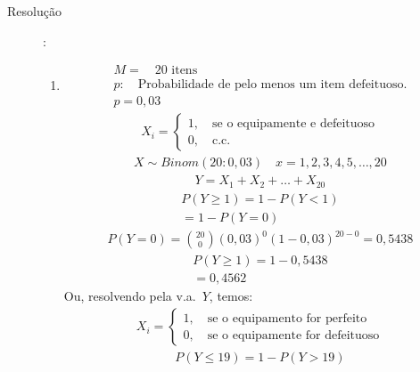 \begin{description}
    \item[Resolução]:

      \begin{enumerate}[label=(\alph*)]

        \item    
          \begin{align*}
            M=\quad \text{20 itens}\\
            p: \quad \text{Probabilidade de pelo menos um item defeituoso.}\\
          p=0,03
        \end{align*}
          \begin{align*}
           X_i= \begin{cases}
             1, \quad \text{se o equipamente e defeituoso}\\
             0, \quad \text{c.c.\ }
            \end{cases} 
          \end{align*}
          \begin{align*}
X           \sim Binom(20:0,03) \quad x=1,2,3,4,5,\dots,20
         \end{align*}
          \begin{align*}
           Y=X_1 + X_2 + \ldots +X_20 
          \end{align*}
          \begin{align*}
            P(Y\ge 1)= 1-P(Y<1)\\
            =1-P(Y=0)
          \end{align*}
          \begin{align*}
            P(Y=0)= \binom{20}{0} (0,03)^0 (1-0,03)^{20-0}
            =0,5438
          \end{align*}
          \begin{align*}
            P(Y\ge 1)= 1-0,5438\\
            =0,4562
          \end{align*}
          Ou, resolvendo pela v.a.\ $Y$, temos:
\begin{align*}
           X_i= \begin{cases}
             1, \quad \text{se o equipamento for perfeito} \\
             0, \quad \text{se o equipamente for defeituoso}
            \end{cases} 
          \end{align*}
          \begin{align*}
            P(Y\le 19)=1-P(Y>19)\\

\end{align*}
\end{enumerate}
\end{description}
